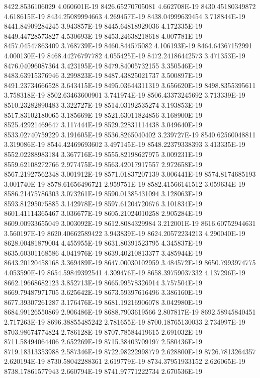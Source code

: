 8422.8536106029  4.060601E-19
8426.65270705081  4.662708E-19
8430.45180349872  4.618615E-19
8434.25089994663  4.269457E-19
8438.04999639454  3.718844E-19
8441.84909284245  3.943857E-19
8445.64818929036  4.172335E-19
8449.44728573827  4.530693E-19
8453.24638218618  4.007781E-19
8457.04547863409  3.768739E-19
8460.844575082  4.106193E-19
8464.64367152991  4.000130E-19
8468.44276797782  4.055425E-19
8472.24186442573  3.471353E-19
8476.04096087364  3.423195E-19
8479.84005732155  3.350546E-19
8483.63915376946  3.299823E-19
8487.43825021737  3.500897E-19
8491.23734666528  3.643415E-19
8495.03644311319  3.656620E-19
8498.8355395611  3.758318E-19
8502.63463600901  3.741974E-19
8506.43373245692  3.713339E-19
8510.23282890483  3.322727E-19
8514.03192535274  3.193853E-19
8517.83102180065  3.185669E-19
8521.63011824856  3.168900E-19
8525.42921469647  3.117444E-19
8529.22831114438  3.049640E-19
8533.02740759229  3.191605E-19
8536.8265040402  3.239727E-19
8540.62560048811  3.319086E-19
8544.42469693602  3.497145E-19
8548.22379338393  3.413335E-19
8552.02288983184  3.367716E-19
8555.82198627975  3.009231E-19
8559.62108272766  2.977475E-19
8563.42017917557  2.972658E-19
8567.21927562348  3.001912E-19
8571.01837207139  3.006441E-19
8574.8174685193  3.001740E-19
8578.61656496721  2.959751E-19
8582.41566141512  3.059634E-19
8586.21475786303  3.073261E-19
8590.01385431094  3.128063E-19
8593.81295075885  3.142978E-19
8597.61204720676  3.101834E-19
8601.41114365467  3.036677E-19
8605.21024010258  2.905284E-19
8609.00933655049  3.003092E-19
8612.8084329984  3.212001E-19
8616.60752944631  3.560197E-19
8620.40662589422  3.943839E-19
8624.20572234213  4.290040E-19
8628.00481879004  4.455955E-19
8631.80391523795  4.345837E-19
8635.60301168586  4.041976E-19
8639.40210813377  3.485944E-19
8643.20120458168  3.369489E-19
8647.00030102959  3.484572E-19
8650.7993974775  4.053590E-19
8654.59849392541  4.309476E-19
8658.39759037332  4.137296E-19
8662.19668682123  3.852713E-19
8665.99578326914  3.757504E-19
8669.79487971705  3.625642E-19
8673.59397616496  3.386160E-19
8677.39307261287  3.176476E-19
8681.19216906078  3.042980E-19
8684.99126550869  2.906486E-19
8688.7903619566  2.807817E-19
8692.58945840451  2.717263E-19
8696.38855485242  2.781655E-19
8700.18765130033  2.734997E-19
8703.98674774824  2.786128E-19
8707.78584419615  2.691032E-19
8711.58494064406  2.652269E-19
8715.38403709197  2.580436E-19
8719.18313353988  2.587346E-19
8722.98222998779  2.628800E-19
8726.7813264357  2.620194E-19
8730.58042288361  2.619779E-19
8734.37951933152  2.626065E-19
8738.17861577943  2.660794E-19
8741.97771222734  2.670536E-19

